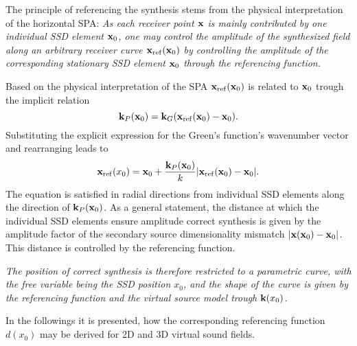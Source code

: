 The principle of referencing the synthesis stems from the physical interpretation of the horizontal SPA:
\emph{As each receiver point $\mathbf{x}$ is mainly contributed by one individual SSD element $\mathbf{x}_0$, one may control the amplitude of the synthesized field along an arbitrary receiver curve $\mathbf{x}_{\mathrm{ref}}(\mathbf{x}_0)$ by controlling the amplitude of the corresponding stationary SSD element $\mathbf{x}_0$ through the referencing function.}

Based on the physical interpretation of the SPA  $\mathbf{x}_{\mathrm{ref}}(\mathbf{x}_0)$ is related to $\mathbf{x}_0$ trough the implicit relation 
\begin{equation}
\label{Eq:PCS_def}
\mathbf{k}_P(\mathbf{x}_0) = \mathbf{k}_G(\mathbf{x}_{\mathrm{ref}}(\mathbf{x}_0)-\mathbf{x}_0).
\end{equation}
Substituting the explicit expression for the Green's function's wavenumber vector and rearranging leads to  
\begin{align}
\label{Eq:xRefyRef_General}
\mathbf{x}_{\mathrm{ref}}(x_0)= \mathbf{x}_0 + \frac{\mathbf{k}_P(\mathbf{x}_0)}{k} |\mathbf{x}_{\mathrm{ref}}(\mathbf{x}_0) - \mathbf{x}_0|.
\end{align}
The equation is satisfied in radial directions from individual SSD elements along the direction of $\mathbf{k}_P(\mathbf{x}_0)$.
As a general statement, the distance at which the individual SSD elements ensure amplitude correct synthesis is given by the amplitude factor of the secondary source dimensionality mismatch $|\mathbf{x}(\mathbf{x}_0) - \mathbf{x}_0|$.
This distance is controlled by the referencing function.
%

\emph{The position of correct synthesis is therefore restricted to a parametric curve, with the free variable being the SSD position $x_0$, and the shape of the curve is given by the referencing function and the virtual source model trough $\mathbf{k}(x_0)$.}

In the followings it is presented, how the corresponding referencing function $d(x_0)$ may be derived for 2D and 3D virtual sound fields.

